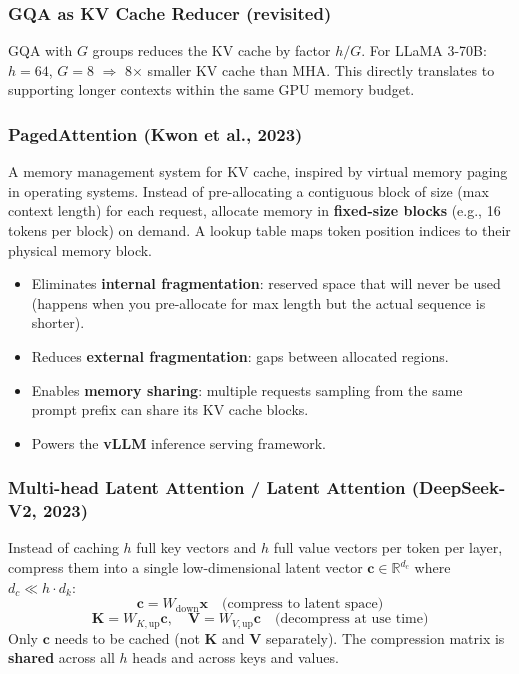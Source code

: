 \documentclass[11pt, a4paper]{article}
\begin{document}
\subsubsection{GQA as KV Cache Reducer (revisited)}

GQA with $G$ groups reduces the KV cache by factor $h/G$. For LLaMA 3-70B: $h=64$, $G=8$ $\Rightarrow$ 8$\times$ smaller KV cache than MHA. This directly translates to supporting longer contexts within the same GPU memory budget.

\subsubsection{PagedAttention (Kwon et al., 2023)}

\begin{defbox}[PagedAttention]
A memory management system for KV cache, inspired by virtual memory paging in operating systems. Instead of pre-allocating a contiguous block of size (max context length) for each request, allocate memory in \textbf{fixed-size blocks} (e.g., 16 tokens per block) on demand. A lookup table maps token position indices to their physical memory block.
\end{defbox}

\begin{itemize}[leftmargin=2em]
  \item Eliminates \textbf{internal fragmentation}: reserved space that will never be used (happens when you pre-allocate for max length but the actual sequence is shorter).
  \item Reduces \textbf{external fragmentation}: gaps between allocated regions.
  \item Enables \textbf{memory sharing}: multiple requests sampling from the same prompt prefix can share its KV cache blocks.
  \item Powers the \textbf{vLLM} inference serving framework.
\end{itemize}

\subsubsection{Multi-head Latent Attention / Latent Attention (DeepSeek-V2, 2023)}

\begin{defbox}
Instead of caching $h$ full key vectors and $h$ full value vectors per token per layer, compress them into a single low-dimensional latent vector $\mathbf{c} \in \mathbb{R}^{d_c}$ where $d_c \ll h \cdot d_k$:
\[
\mathbf{c} = W_{\text{down}} \mathbf{x} \quad \text{(compress to latent space)}
\]
\[
\mathbf{K} = W_{K,\text{up}} \mathbf{c}, \quad \mathbf{V} = W_{V,\text{up}} \mathbf{c} \quad \text{(decompress at use time)}
\]
Only $\mathbf{c}$ needs to be cached (not $\mathbf{K}$ and $\mathbf{V}$ separately). The compression matrix is \textbf{shared} across all $h$ heads and across keys and values.
\end{defbox}
\end{document}
